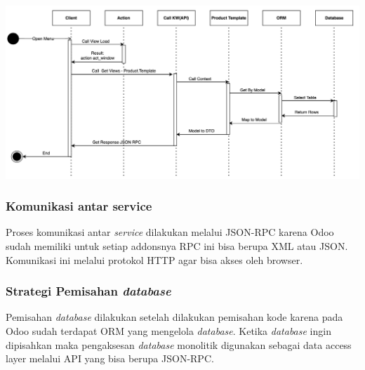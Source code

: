 \begin{center}
	\includegraphics[width=14cm]{img/bab_3/seqDiagGet.png}
	\label{fig:asd}
\end{center}
\subsubsection{Komunikasi antar service}
Proses komunikasi antar \textit{service} dilakukan melalui JSON-RPC karena Odoo sudah memiliki untuk setiap addonsnya RPC ini bisa berupa XML atau JSON. Komunikasi ini melalui protokol  HTTP agar bisa akses oleh browser.  
\\
\subsubsection{Strategi Pemisahan \textit{database}}
Pemisahan \textit{database} dilakukan setelah dilakukan pemisahan kode karena pada Odoo sudah terdapat ORM yang mengelola \textit{database}. Ketika \textit{database} ingin dipisahkan maka pengaksesan \textit{database} monolitik  digunakan sebagai data access layer melalui API yang bisa berupa JSON-RPC.
\\
